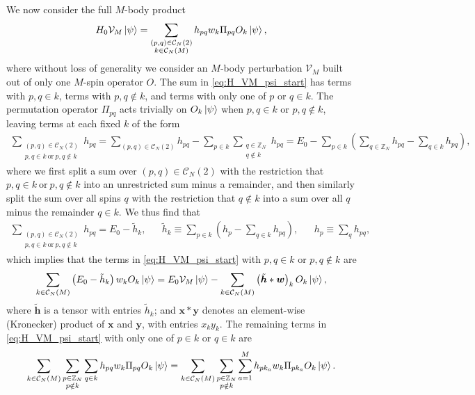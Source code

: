 \documentclass[nofootinbib,notitlepage,11pt]{revtex4-2}
\renewcommand{\t}{\text} %
\newcommand{\p}[1]{\left(#1\right)} %
\newcommand{\m}{\bm} %
\newcommand{\1}{\mathds{1}}
\newcommand{\C}{\mathcal{C}}
\newcommand{\V}{\mathcal{V}}
\newcommand{\ZZ}{\mathbb{Z}}
\begin{document}
We now consider the full $M$-body product
\begin{align}
  H_0 \V_M \ket\psi
  = \sum_{\substack{\p{p,q}\in\C_N\p{2}\\k\in\C_N\p{M}}} h_{pq} w_k
  \Pi_{pq} O_k \ket\psi,
  \label{eq:H_VM_psi_start}
\end{align}
where without loss of generality we consider an $M$-body perturbation
$\V_M$ built out of only one $M$-spin operator $O$.  The sum in
\eqref{eq:H_VM_psi_start} has terms with $p,q\in k$, terms with
$p,q\notin k$, and terms with only one of $p$ or $q\in k$.  The
permutation operator $\Pi_{pq}$ acts trivially on $O_k\ket\psi$ when
$p,q\in k$ or $p,q\notin k$, leaving terms at each fixed $k$ of the
form
\begin{align}
  \sum_{\substack{\p{p,q}\in\C_N\p{2}\\p,q\in k~\t{or}~p,q\notin k}} h_{pq}
  = \sum_{\p{p,q}\in\C_N\p{2}} h_{pq}
  - \sum_{p\in k} \sum_{\substack{q\in\ZZ_N\\q\notin k}} h_{pq}
  = E_0 - \sum_{p\in k}
  \p{\sum_{q\in\ZZ_N} h_{pq} - \sum_{q\in k} h_{pq}},
\end{align}
where we first split a sum over $\p{p,q}\in\C_N\p{2}$ with the
restriction that $p,q\in k~\t{or}~p,q\notin k$ into an unrestricted
sum minus a remainder, and then similarly split the sum over all spins
$q$ with the restriction that $q\notin k$ into a sum over all $q$
minus the remainder $q\in k$.  We thus find that
\begin{align}
  \sum_{\substack{\p{p,q}\in\C_N\p{2}\\p,q\in k~\t{or}~p,q\notin k}} h_{pq}
  = E_0 - \tilde h_k,
  &&
  \tilde h_k \equiv \sum_{p\in k}\p{h_p - \sum_{q\in k}h_{pq}},
  &&
  h_p \equiv \sum_q h_{pq},
\end{align}
which implies that the terms in \eqref{eq:H_VM_psi_start} with
$p,q\in k$ or $p,q\notin k$ are
\begin{align}
  \sum_{k\in\C_N\p{M}} \p{E_0 - \tilde h_k} w_k O_k \ket\psi
  = E_0 \V_M \ket\psi
  - \sum_{k\in\C_N\p{M}} \p{\tilde{\m h} * \m w}_k O_k \ket\psi,
\end{align}
where $\tilde{\m h}$ is a tensor with entries $\tilde h_k$; and
$\m x*\m y$ denotes an element-wise (Kronecker) product of $\m x$ and
$\m y$, with entries $x_ky_k$.  The remaining terms in
\eqref{eq:H_VM_psi_start} with only one of $p\in k$ or $q\in k$ are
\begin{align}
  \sum_{k\in\C_N\p{M}} \sum_{\substack{p\in\ZZ_N\\p\notin k}} \sum_{q\in k}
  h_{pq} w_k \Pi_{pq} O_k \ket\psi
  = \sum_{k\in\C_N\p{M}} \sum_{\substack{p\in\ZZ_N\\p\notin k}}
  \sum_{a=1}^M h_{p k_a} w_k \Pi_{p k_a} O_k \ket\psi.
\end{align}
\end{document}
